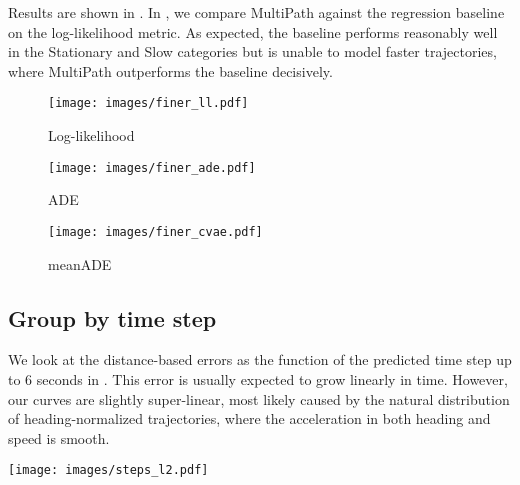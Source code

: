 \documentclass{article}
\newcommand{\multiflow}{MultiPath\xspace}
\begin{document}
Results are shown in . In , we compare \multiflow  against the regression baseline  on the log-likelihood metric. As expected, the baseline performs reasonably well in the Stationary and Slow categories but is unable to model faster trajectories, where \multiflow outperforms the baseline decisively.


\begin{figure*}[!htbp]
\centering
  \begin{subfigure}[b]{0.49\textwidth}
    \texttt{[image: images/finer\_ll.pdf]}
    \caption{Log-likelihood}
    \label{fig:finer_ll}
  \end{subfigure}
  \begin{subfigure}[b]{0.49\textwidth}
    \texttt{[image: images/finer\_ade.pdf]}
    \caption{ADE}
    \label{fig:finer_ade}
  \end{subfigure}
  \begin{subfigure}[b]{0.49\textwidth}
    \texttt{[image: images/finer\_cvae.pdf]}
    \caption{meanADE}
    \label{fig:finer_cvae}
  \end{subfigure}  
\caption{
Detailed results grouped by the groundtruth final waypoint. (a): Detailed comparison between \multiflow  and the regression  baseline on the log-likelihood. (b): Detailed comparison between \multiflow  and the regression  baseline on the ADE. Detailed comparison between \multiflow  and the CVAE baseline on the meanADE. The top 5 trajectories are kept for \multiflow, and 100000 trajectories are sampled from the CVAE.
}
\label{fig:finer}
\end{figure*}


\subsection{Group by time step}

We look at the distance-based errors as the function of the predicted time step up to 6 seconds in . This error is usually expected to grow linearly in time. However, our curves are slightly super-linear, most likely caused by the natural distribution of heading-normalized trajectories, where the acceleration in both heading and speed is smooth.

\begin{figure*}[!htbp]
\centering
\texttt{[image: images/steps\_l2.pdf]}
\caption{
Detailed results from \multiflow  grouped by time step on the ADE and minADE metrics.
}
\label{fig:steps_l2}
\end{figure*}
\end{document}
